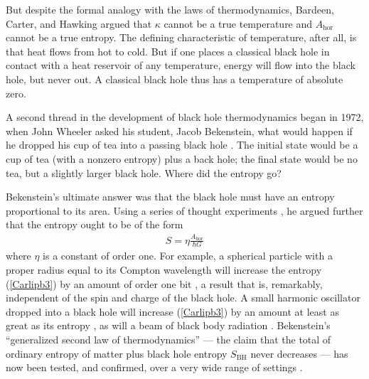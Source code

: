 \documentclass[12pt]{article}
\makeatletter
\def\section{\@startsection{section}{1}{\z@}{3.5ex plus 1ex minus
   .2ex}{2.3ex plus .2ex}{\large\bf}}
\makeatother
\begin{document}
But despite the formal analogy with the laws of thermodynamics, 
Bardeen, Carter, and Hawking argued that $\kappa$ cannot be a true
temperature and $A_{\mathrm{\scriptstyle hor}}$ cannot be a
 true entropy.  The defining characteristic
of temperature, after all, is that heat flows from hot to cold.  But if
one places a classical black hole in contact with a heat reservoir
of any temperature, energy will flow into the black hole, but never 
out.  A classical black hole thus has a temperature of absolute zero.

A second thread in the development of black hole thermodynamics began
in 1972, when John Wheeler asked his student, Jacob Bekenstein, what
would happen if he dropped his cup of tea into a passing black hole
\cite{Wheeler}.  The initial state would be a cup of tea (with a nonzero 
entropy) plus a back hole; the final state would be no tea, but a slightly 
larger black hole.  Where did the entropy go?

Bekenstein's ultimate answer was that the black hole must have an entropy
proportional to its area.  Using a series of thought experiments
\cite{Bekb,Bekenstein},  he argued further that the entropy
ought to be of the form 
\begin{align}
S = \eta \frac{A_{\mathrm{\scriptstyle hor}}}{\hbar G} 
\label{Carlipb3}
\end{align}
where $\eta$ is a constant of order one.  For example, a spherical particle 
with a proper radius equal to its Compton wavelength will increase the
entropy (\ref{Carlipb3}) by an amount of order one bit \cite{Bekenstein},
a result that is, remarkably, independent of the spin and charge of the 
black hole.  A small harmonic oscillator dropped into a black hole will 
increase (\ref{Carlipb3}) by an amount at least as great as its entropy
\cite{Bekenstein}, as will a beam of black body radiation \cite{Bekb}.
Bekenstein's ``generalized second law of thermodynamics'' --- the
claim that the total of ordinary entropy of matter plus black hole
entropy $S_{\scriptscriptstyle\mathrm{BH}}$ never decreases --- has
now been tested, and confirmed, over a very wide range of settings
\cite{Wall,Waldb,Wallx}.

\section{ Hawking radiation \label{HR}}
\end{document}

